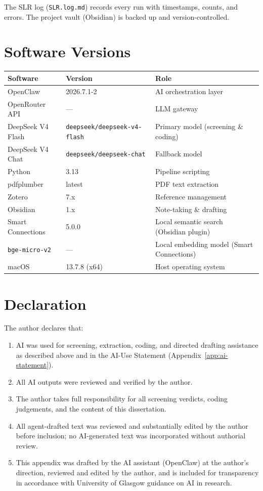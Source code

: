 The SLR log (\texttt{SLR.log.md}) records every run with timestamps, counts, and errors. The project vault (Obsidian) is backed up and version-controlled.

\section{Software Versions}

\begin{table}[H]
\centering
\begin{tabular}{lp{4.5cm}p{5.5cm}}
\toprule
\textbf{Software} & \textbf{Version} & \textbf{Role} \\
\midrule
OpenClaw & 2026.7.1-2 & AI orchestration layer \\
OpenRouter API & --- & LLM gateway \\
DeepSeek V4 Flash & \texttt{deepseek/\allowbreak deepseek-v4-flash} & Primary model (screening \& coding) \\
DeepSeek V4 Chat & \texttt{deepseek/\allowbreak deepseek-chat} & Fallback model \\
Python & 3.13 & Pipeline scripting \\
pdfplumber & latest & PDF text extraction \\
Zotero & 7.x & Reference management \\
Obsidian & 1.x & Note-taking \& drafting \\
Smart Connections & 5.0.0 & Local semantic search (Obsidian plugin) \\
\texttt{bge-micro-v2} & --- & Local embedding model (Smart Connections) \\
macOS & 13.7.8 (x64) & Host operating system \\
\bottomrule
\end{tabular}
\end{table}

\section{Declaration}

The author declares that:

\begin{enumerate}
  \item AI was used for screening, extraction, coding, and directed drafting assistance as described above and in the AI-Use Statement (Appendix~\ref{app:ai-statement}).
  \item All AI outputs were reviewed and verified by the author.
  \item The author takes full responsibility for all screening verdicts, coding judgements, and the content of this dissertation.
  \item All agent-drafted text was reviewed and substantially edited by the author before inclusion; no AI-generated text was incorporated without authorial review.
  \item This appendix was drafted by the AI assistant (OpenClaw) at the author's direction, reviewed and edited by the author, and is included for transparency in accordance with University of Glasgow guidance on AI in research.
\end{enumerate}
